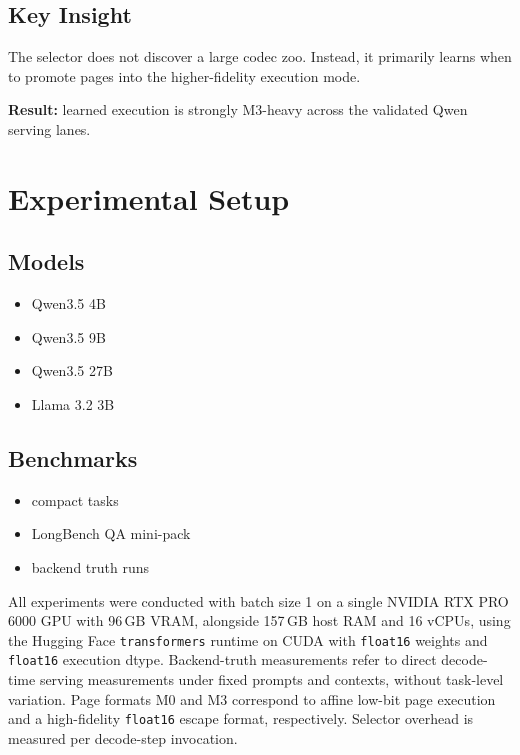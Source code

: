 \documentclass[11pt]{article}
\begin{document}
\subsection{Key Insight}

The selector does not discover a large codec zoo. Instead, it primarily learns when to promote pages into the higher-fidelity execution mode.

\textbf{Result:} learned execution is strongly M3-heavy across the validated Qwen serving lanes.

\FloatBarrier

\section{Experimental Setup}

\subsection{Models}

\begin{itemize}[leftmargin=1.5em]
\item Qwen3.5 4B
\item Qwen3.5 9B
\item Qwen3.5 27B
\item Llama 3.2 3B
\end{itemize}

\subsection{Benchmarks}

\begin{itemize}[leftmargin=1.5em]
\item compact tasks
\item LongBench QA mini-pack
\item backend truth runs
\end{itemize}

All experiments were conducted with batch size 1 on a single NVIDIA RTX PRO 6000 GPU with 96\,GB VRAM, alongside 157\,GB host RAM and 16 vCPUs, using the Hugging Face \texttt{transformers} runtime on CUDA with \texttt{float16} weights and \texttt{float16} execution dtype. Backend-truth measurements refer to direct decode-time serving measurements under fixed prompts and contexts, without task-level variation. Page formats M0 and M3 correspond to affine low-bit page execution and a high-fidelity \texttt{float16} escape format, respectively. Selector overhead is measured per decode-step invocation.
\end{document}

